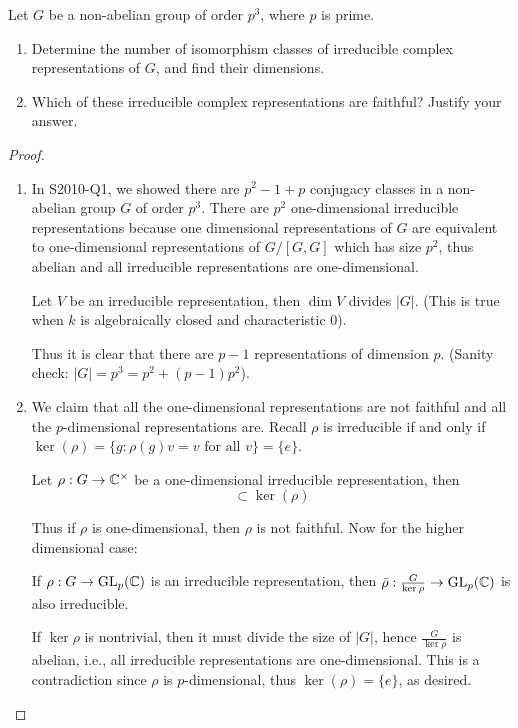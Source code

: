 \begin{prob}[F2010-Q6]
    Let \( G \) be a non-abelian group of order \( p^3 \), where \( p \) is prime.
    
    \begin{enumerate}
        \item Determine the number of isomorphism classes of irreducible complex representations of \( G \), and find their dimensions.
        
        \item Which of these irreducible complex representations are faithful? Justify your answer.
    \end{enumerate}
\end{prob}
\begin{proof}
    \begin{enumerate}
        \item In S2010-Q1, we showed there are $p^2-1+p$ conjugacy classes in a non-abelian group $G$ of order $p^3$. There are $p^2$ one-dimensional irreducible representations because one dimensional representations of $G$ are equivalent to one-dimensional representations of $G/[G,G]$ which has size $p^2$, thus abelian and all irreducible representations are one-dimensional. 
        \begin{lem}[Fact]
            Let $V$ be an irreducible representation, then $\dim V$ divides $|G|$. (This is true when $k$ is algebraically closed and characteristic $0$).
        \end{lem}
        Thus it is clear that there are $p-1$ representations of dimension $p$. (Sanity check: $|G|=p^3=p^2+(p-1)p^2$).
        \item We claim that all the one-dimensional representations are not faithful and all the $p$-dimensional representations are. Recall $\rho$ is irreducible if and only if $\ker(\rho)=\{g: \rho(g)v=v \text{ for all }v\}=\{e\}$.
        \begin{lem}[Fact]
            Let $\rho:G\to\mathbb{C}^\times$ be a one-dimensional irreducible representation, then
            \begin{equation*}
                [G,G]\subset\ker(\rho)
            \end{equation*}
        \end{lem}
        Thus if $\rho$ is one-dimensional, then $\rho$ is not faithful. Now for the higher dimensional case:
        \begin{lem}[Fact]
            If $\rho: G\to\text{GL}_p(\mathbb{C})$ is an irreducible representation, then $\bar{\rho}: \frac{G}{\ker\rho}\to\text{GL}_p(\mathbb{C})$ is also irreducible.
        \end{lem}
        If $\ker\rho$ is nontrivial, then it must divide the size of $|G|$, hence $\frac{G}{\ker\rho}$ is abelian, i.e., all irreducible representations are one-dimensional. This is a contradiction since $\rho$ is $p$-dimensional, thus $\ker(\rho)=\{e\}$, as desired.
    \end{enumerate}
\end{proof}




